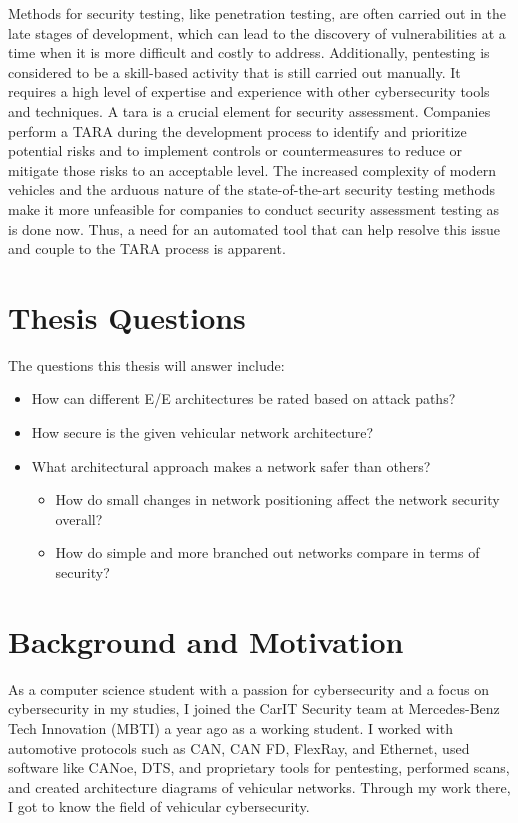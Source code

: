 Methods for security testing, like penetration testing, are often carried out in the late stages of development, which can lead to the discovery of vulnerabilities at a time when it is more difficult and costly to address.
Additionally, pentesting is considered to be a skill-based activity that is still carried out manually.
It requires a high level of expertise and experience with other cybersecurity tools and techniques. 
A \gls{tara} is a crucial element for security assessment. 
Companies perform a TARA during the development process to identify and prioritize potential risks and to implement controls or countermeasures to reduce or mitigate those risks to an acceptable level. 
The increased complexity of modern vehicles and the arduous nature of the state-of-the-art security testing methods make it more unfeasible for companies to conduct security assessment testing as is done now. 
Thus, a need for an automated tool that can help resolve this issue and couple to the TARA process is apparent. 


\section{Thesis Questions}
\label{sec:thesis-questions}

The questions this thesis will answer include:

\begin{itemize}
    \item How can different E/E architectures be rated based on attack paths?
    \item How secure is the given vehicular network architecture?
    \item What architectural approach makes a network safer than others?
    \begin{itemize}
        \item How do small changes in network positioning affect the network security overall?
        \item How do simple and more branched out networks compare in terms of security?
    \end{itemize}
\end{itemize}



\section{Background and Motivation}
\label{sec:background}

As a computer science student with a passion for cybersecurity and a focus on cybersecurity in my studies, I joined the CarIT Security team at Mercedes-Benz Tech Innovation (MBTI) a year ago as a working student. 
I worked with automotive protocols such as CAN, CAN FD, FlexRay, and Ethernet, used software like CANoe, DTS, and proprietary tools for pentesting, performed scans, and created architecture diagrams of vehicular networks. 
Through my work there, I got to know the field of vehicular cybersecurity.
\\

